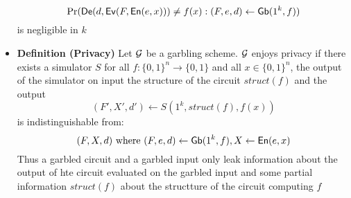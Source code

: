 \begin{itemize}
    \begin{equation*}
        \Pr(\mathsf{De}(d, \mathsf{Ev}(F, \mathsf{En}(e, x))) \neq f(x) : (F, e, d) \leftarrow \mathsf{Gb}(1^k, f))
    \end{equation*}
    is negligible in $k$
    \item \textbf{Definition (Privacy)} Let $\mathcal G$ be a garbling scheme. $\mathcal G$ enjoys privacy if there exists a simulator $S$ for all $f: \{0,1\}^n \to \{0,1\}$ and all $x \in \{0, 1\}^n$, the output of the simulator on input the structure of the circuit $struct(f)$ and the output
    \begin{equation*}
        (F', X', d') \leftarrow S(1^k, struct(f), f(x))
    \end{equation*}
    is indistinguishable from:
    \begin{equation*}
        (F,X,d) \text{ where } (F, e, d) \leftarrow \mathsf{Gb}(1^k, f), X \leftarrow \mathsf{En}(e,x)
    \end{equation*}
    Thus a garbled circuit and a garbled input only leak information about the output of hte circuit evaluated on the garbled input and some partial information $struct(f)$ about the structture of the circuit computing $f$
\end{itemize}

